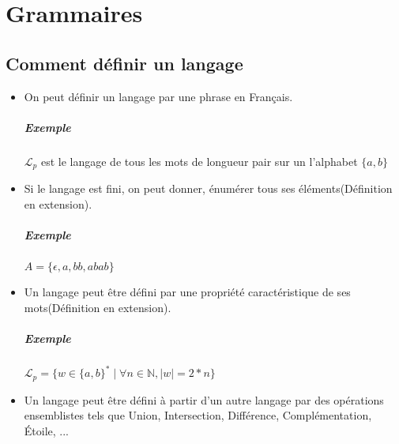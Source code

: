 \chapter{Grammaires} %
\label{cha:grammaires}


\section{Comment définir un langage} %
\label{sec:comment_d_finir_un_langage}

\begin{itemize}
	\item On peut définir un langage par une phrase en Français.
	
	\paragraph{Exemple} %
	\label{par:exemple}

	$\mathcal{L}_p$ est le langage de tous les mots de longueur pair sur un l'alphabet $\{a,b\}$\\



	\item Si le langage est fini, on peut donner, énumérer tous ses éléments(Définition en extension).

	\paragraph{Exemple} %
	\label{par:exemple}

	$A=\{\epsilon, a, bb, abab\}$\\
	


	\item Un langage peut être défini par une propriété caractéristique de ses mots(Définition en extension).

	\paragraph{Exemple} %
	\label{par:exemple}

	$\mathcal{L}_p = \{w \in \{a,b\}^* \mid \forall n \in \mathbb{N}, \left|w\right|=2*n\}$\\
	


	\item Un langage peut être défini à partir d'un autre langage par des opérations ensemblistes tels que Union, Intersection, Différence, Complémentation, Étoile, ...\\



\end{itemize}
